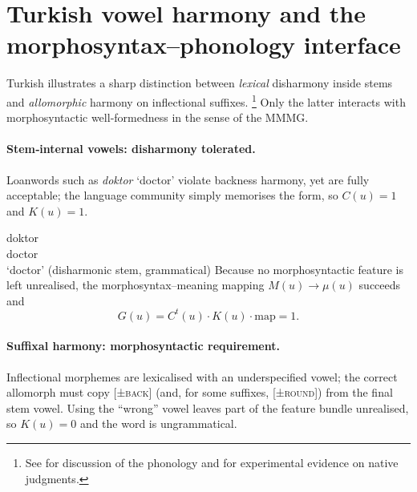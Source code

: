 \documentclass[12pt,letterpaper]{article}
\begin{document}
\newpage
\appendix

\section{Turkish vowel harmony and the morphosyntax--phonology interface}
\label{app:turkish-harmony}

Turkish illustrates a sharp distinction between \emph{lexical} disharmony inside stems and
\emph{allomorphic} harmony on inflectional suffixes.%
\footnote{See \autocite{Sezer1981,KabakVogel2001} for discussion of the phonology and \autocite{Arik2015} for experimental evidence on native judgments.} 
Only the latter interacts with morphosyntactic well‑formedness in the sense of the MMMG.

\paragraph{Stem‑internal vowels: disharmony tolerated.}
Loanwords such as \textit{doktor} `doctor' violate backness harmony, yet are fully acceptable;
the language community simply memorises the form, so $C(u)=1$ and $K(u)=1$.

\ea \label{ex:doktor}
\gll doktor \\
     doctor\\
\glt `doctor' (disharmonic stem, grammatical)
\z
Because no morphosyntactic feature is left unrealised, the morphosyntax--meaning
mapping $\!M(u)\!\rightarrow\!\mu(u)$ succeeds and
\[
G(u)=C^t(u)\cdot K(u)\cdot\text{map}=1.
\]

\paragraph{Suffixal harmony: morphosyntactic requirement.}
Inflectional morphemes are lexicalised with an underspecified vowel;
the correct allomorph must copy \textsc{[±back]} (and, for some
suffixes, \textsc{[±round]}) from the final stem vowel.
Using the ``wrong'' vowel leaves part of the feature bundle unrealised,
so $K(u)=0$ and the word is ungrammatical.

\ea  \label{ex:kitap-pl}
\z
\z
\end{document}
